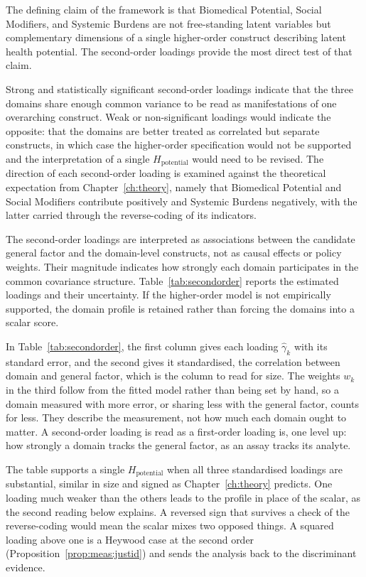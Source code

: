 The defining claim of the framework is that Biomedical Potential, Social Modifiers, and Systemic Burdens are not free-standing latent variables but complementary dimensions of a single higher-order construct describing latent health potential. The second-order loadings provide the most direct test of that claim.

Strong and statistically significant second-order loadings indicate that the three domains share enough common variance to be read as manifestations of one overarching construct. Weak or non-significant loadings would indicate the opposite: that the domains are better treated as correlated but separate constructs, in which case the higher-order specification would not be supported and the interpretation of a single $H_{\text{potential}}$ would need to be revised. The direction of each second-order loading is examined against the theoretical expectation from Chapter~\ref{ch:theory}, namely that Biomedical Potential and Social Modifiers contribute positively and Systemic Burdens negatively, with the latter carried through the reverse-coding of its indicators.

The second-order loadings are interpreted as associations between the candidate general factor and the domain-level constructs, not as causal effects or policy weights. Their magnitude indicates how strongly each domain participates in the common covariance structure. Table~\ref{tab:secondorder} reports the estimated loadings and their uncertainty. If the higher-order model is not empirically supported, the domain profile is retained rather than forcing the domains into a scalar score.

In Table~\ref{tab:secondorder}, the first column gives each loading $\hat{\gamma}_k$ with its standard error, and the second gives it standardised, the correlation between domain and general factor, which is the column to read for size. The weights $w_k$ in the third follow from the fitted model rather than being set by hand, so a domain measured with more error, or sharing less with the general factor, counts for less. They describe the measurement, not how much each domain ought to matter. A second-order loading is read as a first-order loading is, one level up: how strongly a domain tracks the general factor, as an assay tracks its analyte.

The table supports a single $H_{\text{potential}}$ when all three standardised loadings are substantial, similar in size and signed as Chapter~\ref{ch:theory} predicts. One loading much weaker than the others leads to the profile in place of the scalar, as the second reading below explains. A reversed sign that survives a check of the reverse-coding would mean the scalar mixes two opposed things. A squared loading above one is a Heywood case at the second order (Proposition~\ref{prop:meas:justid}) and sends the analysis back to the discriminant evidence.

